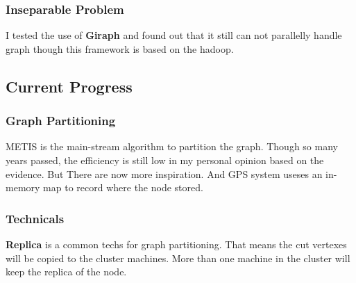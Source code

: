 \documentclass{article}
\begin{document}
	\subsubsection{Inseparable Problem}
	I tested the use of \textbf{Giraph}\cite{giraph} and found out that it still can not parallelly handle graph though this framework is based on the hadoop\cite{hadoop}.

	\subsection{Current Progress}
	\subsubsection{Graph Partitioning}
	METIS\cite{metis} is the main-stream algorithm to partition the graph. Though so many years passed, the efficiency is still low in my personal opinion based on the evidence\cite{salihoglu2013gps:}. But There are now more inspiration. And GPS system useses an in-memory map to record where the node stored.
	\subsubsection{Technicals}
	\textbf{Replica} is a common techs for graph partitioning. That means the cut vertexes will be copied to the cluster machines. More than one machine in the cluster will keep the replica of the node.
\end{document}
